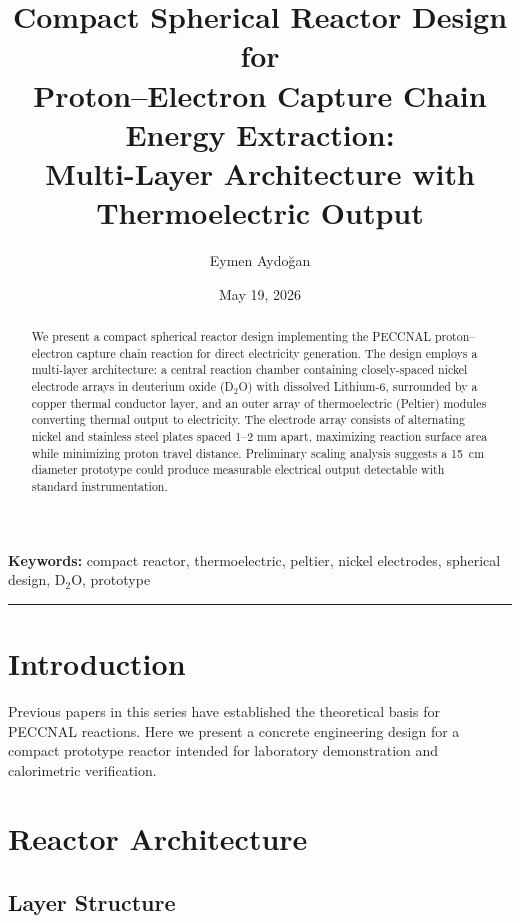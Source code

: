 \documentclass[12pt,a4paper]{article}
\title{\textbf{Compact Spherical Reactor Design for\\
Proton--Electron Capture Chain Energy Extraction:\\
Multi-Layer Architecture with Thermoelectric Output}}
\author{Eymen Aydoğan}
\date{May 19, 2026}
\begin{document}
\maketitle

\begin{abstract}
We present a compact spherical reactor design implementing the PECCNAL
proton--electron capture chain reaction for direct electricity
generation. The design employs a multi-layer architecture: a central
reaction chamber containing closely-spaced nickel electrode arrays
in deuterium oxide (D$_2$O) with dissolved Lithium-6, surrounded by
a copper thermal conductor layer, and an outer array of thermoelectric
(Peltier) modules converting thermal output to electricity.
The electrode array consists of alternating nickel and stainless
steel plates spaced 1--2 mm apart, maximizing reaction surface area
while minimizing proton travel distance. Preliminary scaling analysis
suggests a 15~cm diameter prototype could produce measurable
electrical output detectable with standard instrumentation.
\end{abstract}

\noindent\textbf{Keywords:} compact reactor, thermoelectric,
peltier, nickel electrodes, spherical design, D$_2$O, prototype

\hrule\vspace{1em}

\section{Introduction}
Previous papers in this series have established the theoretical
basis for PECCNAL reactions. Here we present a concrete engineering
design for a compact prototype reactor intended for laboratory
demonstration and calorimetric verification.

\section{Reactor Architecture}

\subsection{Layer Structure}
\end{document}
